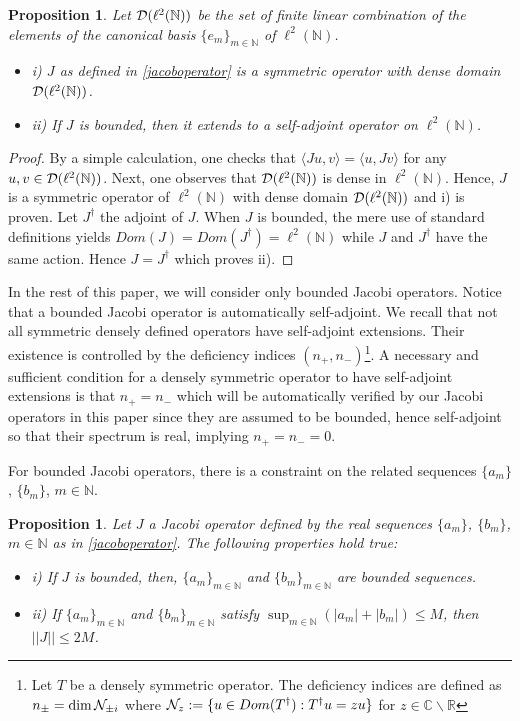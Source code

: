 \documentclass[a4paper,11pt,twoside]{article}
\numberwithin{equation}{section}
\newtheorem{proposition}[Theorem]{Proposition}
\theoremstyle{nonumberplain}
\newtheorem{proof}{Proof}
\begin{document}
\begin{proposition}\label{extend-self}
Let ${\cal{D}}(\ell^2(\mathbb{N}))$ be the set of finite linear combination of the elements of the canonical basis $\{e_m\}_{m\in\mathbb{N}}$ of $\ell^2(\mathbb{N})$.
\begin{itemize}
\vspace*{-3pt}
\setlength{\itemsep}{-1pt}
\item i) $J$ as defined in \eqref{jacoboperator} is a symmetric operator with dense domain ${\cal{D}}(\ell^2(\mathbb{N}))$.
\item ii) If $J$ is bounded, then it extends to a self-adjoint operator on $\ell^2(\mathbb{N})$.
\end{itemize}
\end{proposition}
\begin{proof}
By a simple calculation, one checks that $\langle Ju,v \rangle=\langle u,Jv \rangle$ for any $u,v\in{\cal{D}}(\ell^2(\mathbb{N}))$. Next, one observes that ${\cal{D}}(\ell^2(\mathbb{N}))$ is dense in $\ell^2(\mathbb{N})$. Hence, $J$ is a symmetric operator of $\ell^2(\mathbb{N})$ with dense domain ${\cal{D}}(\ell^2(\mathbb{N}))$ and i) is proven. Let $J^\dag$ the adjoint of $J$. When $J$ is bounded, the mere use of standard definitions yields $Dom(J)=Dom(J^\dag)=\ell^2(\mathbb{N})$ while $J$ and $J^\dag$ have the same action. Hence 
$J=J^\dag$ which proves ii).
\end{proof}
In the rest of this paper, we will consider only bounded Jacobi operators. Notice that a bounded Jacobi operator is automatically self-adjoint. We recall that not all symmetric densely defined operators have self-adjoint extensions. Their existence is controlled by the deficiency indices $(n_+,n_-)${\footnote{Let $T$ be a densely symmetric operator. The deficiency indices are defined as $n_\pm=\dim{\cal{N}}_{\pm i}$ where ${\cal{N}}_z:=\{u\in Dom(T^\dag):T^\dag u=zu \}$ for $z\in\mathbb{C}\backslash\mathbb{R}$}}. A necessary and sufficient condition for a densely symmetric operator to have self-adjoint extensions is that $n_+=n_-$ which will be automatically verified by our Jacobi operators in this paper since they are  assumed to be bounded, hence self-adjoint so that their spectrum is real, implying $n_+=n_-=0$.\par
For bounded Jacobi operators, there is a constraint on the related sequences $\{a_m\}$, $\{b_m\}$, $m\in\mathbb{N}$.
\begin{proposition}\label{jaco-bounded}
Let $J$ a Jacobi operator defined by the real sequences $\{a_m\}$, $\{b_m\}$, $m\in\mathbb{N}$ as in \eqref{jacoboperator}. The following properties hold true:
\begin{itemize}
\vspace*{-3pt}
\setlength{\itemsep}{-1pt}
\item i) If $J$ is bounded, then, $\{a_m\}_{m\in\mathbb{N}}$ and $\{b_m\}_{m\in\mathbb{N}}$ are bounded sequences.
\item ii) If $\{a_m\}_{m\in\mathbb{N}}$ and $\{b_m\}_{m\in\mathbb{N}}$ satisfy $\sup_{m\in\mathbb{N}}(|a_m|+|b_m|)\le M$, then $||J||\le2 M$.
\end{itemize}
\end{proposition}
\end{document}
